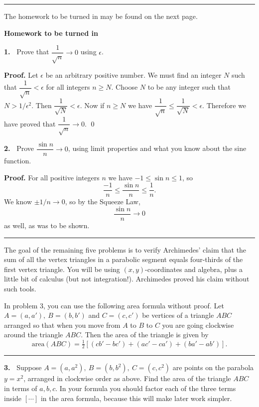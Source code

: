 \documentclass[12pt]{article}
\newcommand{\ep}{\epsilon}
\theoremstyle{definition}
\theoremstyle{remark}
\theoremstyle{definition}
\newenvironment{Proof}{\noindent\textbf{Proof.}}{}
\begin{document}
\rule{\textwidth}{1pt}
The homework to be turned in may be found on the next page.
\newpage

{\bf Homework to be turned in}

{\bf 1.\ } Prove that $\dfrac{1}{\sqrt{n}}\to 0$ using $\ep$. 

\begin{Proof} 
Let $\ep$ be an arbitrary positive number. 
\newline
We must find an integer $N$ such that $\dfrac{1}{\sqrt{n}}<\ep$ for all integers $n\geq N$. 
\newline
Choose $N$ to be any integer such that $N> 1/\ep^2$. 
Then $\dfrac{1}{\sqrt{N}}<\ep$. 
\newline
Now if $n\geq N$ we have $\dfrac{1}{\sqrt{n}}\leq \dfrac{1}{\sqrt{N}}<\ep$. 
Therefore we have proved that  $\dfrac{1}{\sqrt{n}}\to 0$. 
\qed
\end{Proof}

\vskip10pt
{\bf 2.\ } Prove $\dfrac{\sin n}{n}\to 0$, using limit properties and what you know about the sine function. 

\begin{Proof} For all positive integers $n$ we have $-1\leq \sin n\leq 1$, so  
\[\frac{-1}{n}\leq \frac{\sin n}{n}\leq \frac{1}{n}.\]
We know $\pm 1/n\to0$, so by the Squeeze Law, 
\[\frac{\sin n}{n}\to 0\]
as well, as was to be shown. 
\end{Proof} 

\rule{\textwidth}{1pt}
The goal of the remaining five problems is to verify Archimedes' claim that the sum of all the vertex triangles in a parabolic segment equals four-thirds of the first vertex triangle. You will be using $(x,y)$-coordinates and algebra, plus a little bit of calculus (but not integration!). Archimedes proved his claim without such tools. 

In problem 3, you can use the following area formula without proof. Let 
$A=(a,a'),\  B=(b,b')$ and $ C=(c,c')$
be vertices of a triangle $ABC$ arranged so that when you move from $A$ to $B$ to $C$ you are going clockwise around the triangle $ABC$. Then the area of the triangle is given by
\[\text{area}(ABC)=\tfrac{1}{2}\left[(cb'-bc')+(ac'-ca')+(ba'-ab')\right].\]
\rule{\textwidth}{1pt}

{\bf 3.\ } Suppose $A=(a,a^2),\ B=(b,b^2),\ C=(c,c^2)$ are  points on the parabola $y=x^2$, arranged in clockwise order as above. 
Find the area of the triangle $ABC$ in terms of $a,b,c$. In your formula you should factor each of the three terms inside $[\cdots]$ in the area formula, because this will make later work simpler.
\end{document}
